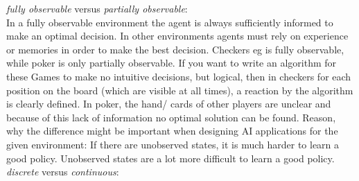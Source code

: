 \documentclass[10pt,a4paper]{article}
\begin{document}
		
		
		\noindent \textit{fully observable} versus \textit{partially observable}:
		\\ 
		In a fully observable environment the agent is always sufficiently informed to make an optimal decision. In other environments agents must rely on experience or memories in order to make the best decision.
		Checkers eg is fully observable, while poker is only partially observable. If you want to write an algorithm for these Games to make no intuitive decisions, but logical, then in checkers for each position on the board (which are visible at all times), a reaction by the algorithm is clearly defined. In poker, the hand/ cards of other players are unclear and because of this lack of information no optimal solution can be found.
Reason, why the difference might be important when designing AI applications for the given environment:
If there are unobserved states, it is much harder to learn a good policy. Unobserved states are a lot more difficult to learn a good policy.
		\noindent \textit{discrete} versus \textit{continuous}:
		\\ 
		 
\end{document}
